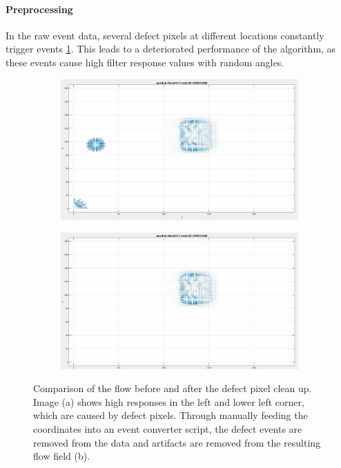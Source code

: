 \paragraph{Preprocessing}
In the raw event data, several defect pixels at different locations constantly trigger events \ref{fig:defect-pixel-cleanup}. 
This leads to a deteriorated performance of the algorithm, as these events cause high filter response values with random angles.

\begin{figure}[tb]
\centering
\begin{subfigure}{.45\textwidth}
  \centering
  \includegraphics[height=.5\linewidth]{figs/defect-pixels/defect-quadrat.png}
  \caption{}
\end{subfigure}
\begin{subfigure}{.45\textwidth}
  \centering
  \includegraphics[height=.5\linewidth]{figs/defect-pixels/cleaned-quadrat.png}  \caption{}
\end{subfigure}
\caption[Preprocessing step: Removing events from defect pixels.]{Comparison of the flow before and after the defect pixel clean up. Image (a) shows high responses in the left and lower left corner, which are caused by defect pixels. Through manually feeding the coordinates into an event converter script, the defect events are removed from the data and artifacts are removed from the resulting flow field (b).}
\label{fig:defect-pixel-cleanup}
\end{figure}


